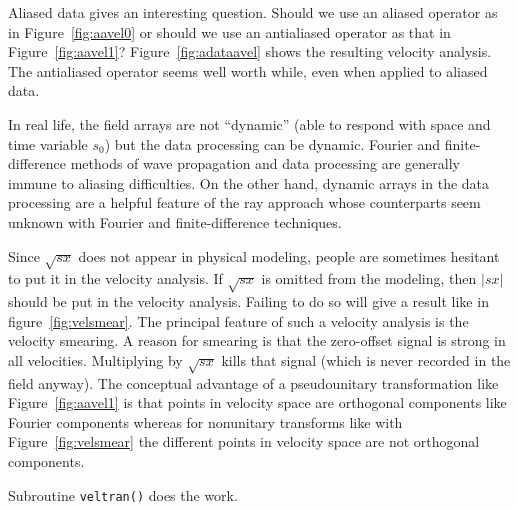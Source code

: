\par
Aliased data gives an interesting question.
Should we use an aliased operator as in Figure~\ref{fig:aavel0}
or should we use an antialiased operator as that in Figure~\ref{fig:aavel1}?
Figure~\ref{fig:adataavel} shows the resulting velocity analysis.
The antialiased operator seems well worth while,
even when applied to aliased data.
\par
In real life, the field arrays are not ``dynamic''
(able to respond with space and time variable $s_0$)
but the data processing can be dynamic.
Fourier and finite-difference methods of wave propagation
and data processing are generally immune to aliasing difficulties.
On the other hand,
dynamic arrays in the data processing
are a helpful feature of the ray approach whose counterparts
seem unknown with Fourier and finite-difference techniques.

\par
Since $\sqrt{sx}$ does not appear in physical modeling,
people are sometimes hesitant to put it in the velocity analysis.
If $\sqrt{sx}$ is omitted from the modeling,
then $|sx|$ should be put in the velocity analysis.
Failing to do so will give a result like in figure~\ref{fig:velsmear}.
The principal feature of such a velocity analysis
is the velocity smearing.
A reason for smearing is that the zero-offset signal
is strong in all velocities.
Multiplying by $\sqrt{sx}$ kills that signal
(which is never recorded in the field anyway).
The conceptual advantage of a pseudounitary transformation 
like Figure~\ref{fig:aavel1} is that points in velocity space
are orthogonal components like Fourier components
whereas for nonunitary transforms
like with Figure~\ref{fig:velsmear} 
the different points in velocity space
are not orthogonal components.

\par
Subroutine {\tt veltran()} does the work.


